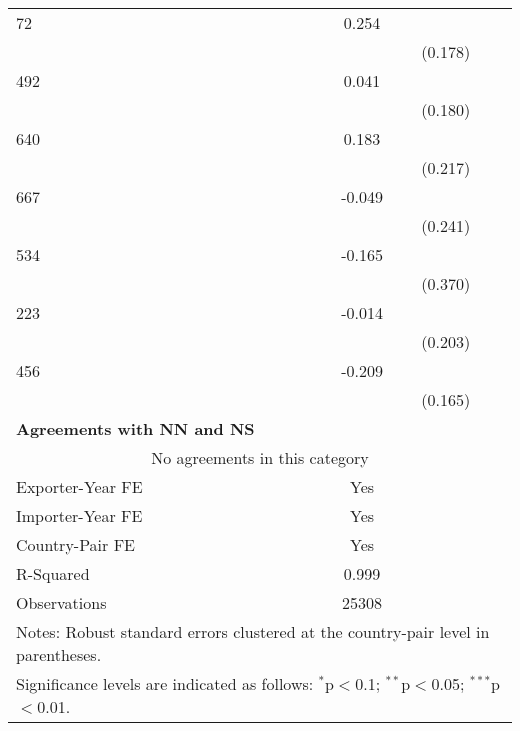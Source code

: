 \begin{table}[htbp]
\begin{adjustbox}{max width=\textwidth}
\begin{tabular}{lccc}
    72 & 0.254 &  &  \\
    &  & (0.178) &  \\
    492 & 0.041 &  &  \\
    &  & (0.180) &  \\
    640 & 0.183 &  &  \\
    &  & (0.217) &  \\
    667 & -0.049 &  &  \\
    &  & (0.241) &  \\
    534 & -0.165 &  &  \\
    &  & (0.370) &  \\
    223 & -0.014 &  &  \\
    &  & (0.203) &  \\
    456 & -0.209 &  &  \\
    &  & (0.165) &  \\
    \hline
    \textbf{Agreements with NN and NS} &  &  &  \\
    \hline
    \multicolumn{4}{c}{No agreements in this category} \\
    \hline
    Exporter-Year FE & Yes \\
    Importer-Year FE & Yes \\
    Country-Pair FE & Yes \\
    R-Squared & 0.999 \\
    Observations & 25308 \\
    \hline
    \multicolumn{4}{l}{\footnotesize{Notes: Robust standard errors clustered at the country-pair level in parentheses.}} \\
    \multicolumn{4}{l}{\footnotesize{Significance levels are indicated as follows: $^{\ast}$p$<$0.1; $^{\ast\ast}$p$<$0.05; $^{\ast\ast\ast}$p$<$0.01.}} \\
    \end{tabular}
    \end{adjustbox}
\end{table}
